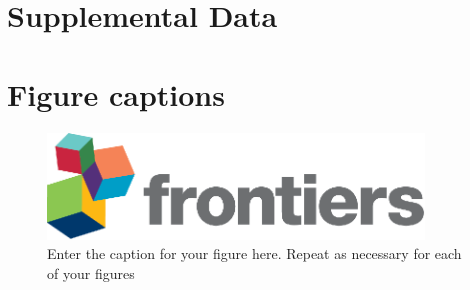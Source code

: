 \documentclass[utf8]{FrontiersinHarvard} %
\begin{document}
\section*{Supplemental Data}





\section*{Figure captions}


\begin{figure}[h!]
\begin{center}
\includegraphics[width=10cm]{logo1}%
\end{center}
\caption{ Enter the caption for your figure here.  Repeat as  necessary for each of your figures}\label{fig:1}
\end{figure}
\end{document}

